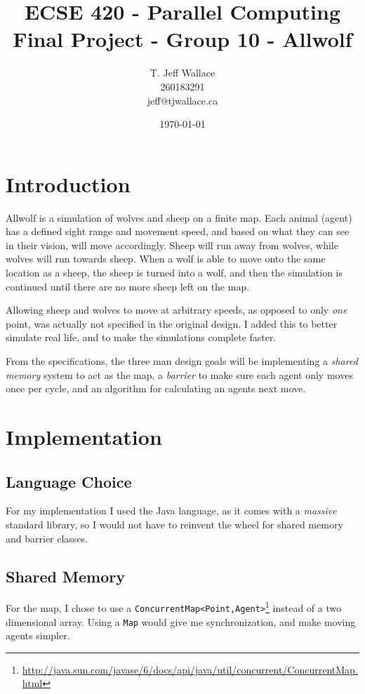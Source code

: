 \documentclass[pdftex,10pt]{article}
\begin{document}
\title{{\sc ECSE 420 - Parallel Computing} \\ Final Project - Group 10 - Allwolf}
\author{T. Jeff Wallace \\ 260183291 \\ jeff@tjwallace.ca}
\date{\today}
\maketitle
\clearpage


\section{Introduction}\label{intro}
Allwolf is a simulation of wolves and sheep on a finite map.  Each animal (agent) has a defined sight range and movement speed, and based on what they can see in their vision, will move accordingly.  Sheep will run away from wolves, while wolves will run towards sheep.  When a wolf is able to move onto the same location as a sheep, the sheep is turned into a wolf, and then the simulation is continued until there are no more sheep left on the map.

Allowing sheep and wolves to move at arbitrary speeds, as opposed to only {\em one} point, was actually not specified in the original design.  I added this to better simulate real life, and to make the simulations complete faster.

From the specifications, the three man design goals will be implementing a {\em shared memory} system to act as the map, a {\em barrier} to make sure each agent only moves once per cycle, and an algorithm for calculating an agents next move.

\section{Implementation}\label{impl}
\subsection{Language Choice}\label{language}
For my implementation I used the Java language, as it comes with a {\em massive} standard library, so I would not have to reinvent the wheel for shared memory and barrier classes.

\subsection{Shared Memory}\label{sharedMemory}
For the map, I chose to use a {\tt ConcurrentMap<Point,Agent>}\footnote{\url{http://java.sun.com/javase/6/docs/api/java/util/concurrent/ConcurrentMap.html}} instead of a two dimensional array.  Using a {\tt Map} would give me synchronization, and make moving agents simpler.
\end{document}
